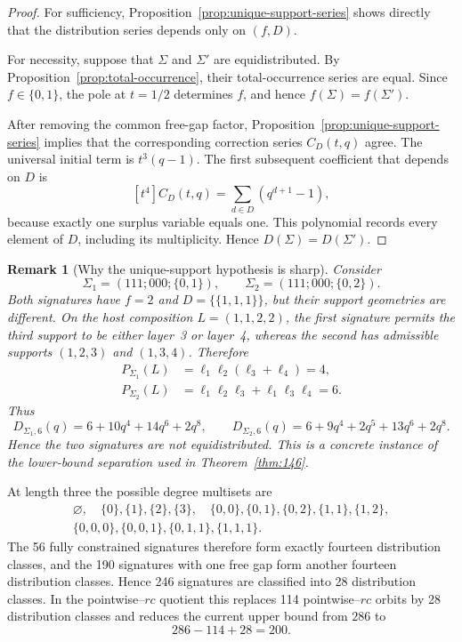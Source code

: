 \documentclass[12pt]{article}
\newtheorem{remark}[thm]{Remark}
\begin{document}
\begin{proof}
For sufficiency, Proposition~\ref{prop:unique-support-series} shows directly
that the distribution series depends only on $(f,D)$.

For necessity, suppose that $\Sigma$ and $\Sigma'$ are equidistributed.
By Proposition~\ref{prop:total-occurrence}, their total-occurrence series are
equal.  Since $f\in\{0,1\}$, the pole at $t=1/2$ determines $f$,
and hence $f(\Sigma)=f(\Sigma')$.

After removing the common free-gap factor,
Proposition~\ref{prop:unique-support-series} implies that the corresponding
correction series $C_D(t,q)$ agree.  The universal initial term is
$t^3(q-1)$.  The first subsequent coefficient that depends on $D$ is
\[
[t^4]C_D(t,q)
=
\sum_{d\in D}(q^{d+1}-1),
\]
because exactly one surplus variable equals one.  This polynomial records
every element of $D$, including its multiplicity.  Hence
$D(\Sigma)=D(\Sigma')$.
\end{proof}

\begin{remark}[Why the unique-support hypothesis is sharp]
Consider
\[
\Sigma_1=(111;000;\{0,1\}),
\qquad
\Sigma_2=(111;000;\{0,2\}).
\]
Both signatures have $f=2$ and
$D=\{\!\{1,1,1\}\!\}$, but their support geometries are different.  On the
host composition $L=(1,1,2,2)$, the first signature permits the third support
to be either layer~3 or layer~4, whereas the second has admissible supports
$(1,2,3)$ and $(1,3,4)$.  Therefore
\[
\begin{aligned}
P_{\Sigma_1}(L)&=\ell_1\ell_2(\ell_3+\ell_4)=4,\\
P_{\Sigma_2}(L)&=\ell_1\ell_2\ell_3+\ell_1\ell_3\ell_4=6.
\end{aligned}
\]
Thus
\[
D_{\Sigma_1,6}(q)=6+10q^4+14q^6+2q^8,
\qquad
D_{\Sigma_2,6}(q)=6+9q^4+2q^5+13q^6+2q^8.
\]
Hence the two signatures are not equidistributed.  This is a concrete
instance of the lower-bound separation used in
Theorem~\ref{thm:146}.
\end{remark}

At length three the possible degree multisets are
\[
\begin{gathered}
\varnothing,\quad\{0\},\{1\},\{2\},\{3\},\quad
\{0,0\},\{0,1\},\{0,2\},\{1,1\},\{1,2\},\\
\{0,0,0\},\{0,0,1\},\{0,1,1\},\{1,1,1\}.
\end{gathered}
\]
The 56 fully constrained signatures therefore form exactly fourteen
distribution classes, and the 190 signatures with one free gap form another
fourteen distribution classes.
Hence 246 signatures are classified into 28 distribution classes.  In the
pointwise--$rc$ quotient this replaces 114 pointwise--$rc$ orbits by 28
distribution classes and reduces the current upper bound from $286$ to
\[
286-114+28=200.
\]
\end{document}
